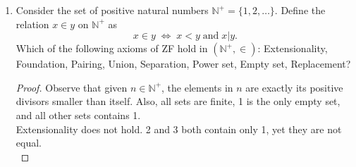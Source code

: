 \documentclass{article}
\begin{document}
\begin{enumerate}
\begin{proof}
      Next, we show that $\alpha$ is also the least non-empty limit ordinal.
      $\alpha$ is clearly non-empty since it contains the empty set. Assume
      by contradiction that $\beta$ is a non-empty limit ordinal that is
      smaller than $\alpha$. Being a limit ordinal, $\beta$ must be closed
      under successor: if there is a $\gamma\in\beta$ whose successor
      $S(\gamma)$ is not in $\beta$, then $\beta$ must either be equal
      $S(\gamma)$ or be smaller than $S(\gamma)$. The former cannot be true
      since $\beta$ is a limit ordinal. Yet the latter also cannot be true
      because ordinals containing $\gamma$ must either equal $S(\gamma)$ or
      contain $S(\gamma)$. So $\beta$ is non-empty, closed under
      successor, and smaller than $\alpha$, which contradicts our earlier
      proof that $\alpha$ is the least non-empty ordinal closed under
      successor. \\

      Finally, we show that $\alpha$ is also the least infinite ordinal.
      Assume by contradiction that the least infinite ordinal $\beta$ is
      contained in $\alpha$. Then since $\alpha$ is the least non-empty
      limit ordinal as we have shown in the previous paragraph, $\beta$
      must be a successor ordinal. Then the predecessor of $\beta$ would
      also be an infinite ordinal, which contradicts our choice of $\beta$
      as the least infinite ordinal. 
    \end{proof}

  \item Consider the set of positive natural numbers
    $\mathbb{N}^+=\{1,2,\ldots\}$. Define the relation $x\in y$ on
    $\mathbb{N}^+$ as
    \begin{equation*}
      x\in y\; \Leftrightarrow\; x<y\; \text{and}\; x|y.
    \end{equation*}
    Which of the following axioms of ZF hold in $(\mathbb{N}^+,\in)$:
    Extensionality, Foundation, Pairing, Union, Separation, Power set,
    Empty set, Replacement?

    \begin{proof}
      Observe that given $n\in\mathbb{N}^+$, the elements in $n$ are
      exactly its positive divisors smaller than itself. Also, all sets
      are finite, 1 is the only empty set, and all other sets contains 1.
      \\

      Extensionality does not hold. 2 and 3 both contain only 1, yet they
      are not equal. \\


\end{proof}
\end{enumerate}
\end{document}
